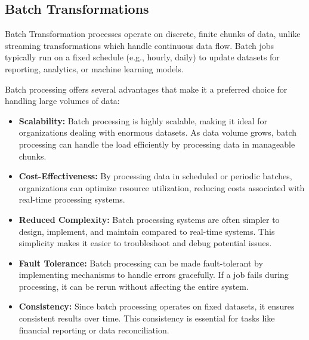 \subsection*{Batch Transformations}
Batch Transformation processes operate on discrete, finite chunks
of data, unlike streaming transformations which handle continuous
data flow. Batch jobs typically run on a fixed schedule
(e.g., hourly, daily) to update datasets for reporting, analytics,
or machine learning models.

Batch processing offers several advantages that make it a preferred
choice for handling large volumes of data:
\begin{itemize}
    \item \textbf{Scalability:} Batch processing is highly scalable,
    making it ideal for organizations dealing with enormous datasets.
    As data volume grows, batch processing can handle the load
    efficiently by processing data in manageable chunks.
    
    \item \textbf{Cost-Effectiveness:} By processing data in scheduled
    or periodic batches, organizations can optimize resource
    utilization, reducing costs associated with real-time processing
    systems.

    \item \textbf{Reduced Complexity:} Batch processing systems are
    often simpler to design, implement, and maintain compared to
    real-time systems. This simplicity makes it easier to troubleshoot
    and debug potential issues.

    \item \textbf{Fault Tolerance:} Batch processing can be made
    fault-tolerant by implementing mechanisms to handle errors
    gracefully. If a job fails during processing, it can be rerun
    without affecting the entire system.

    \item \textbf{Consistency:} Since batch processing operates on
    fixed datasets, it ensures consistent results over time. This
    consistency is essential for tasks like financial reporting or
    data reconciliation.
\end{itemize}




